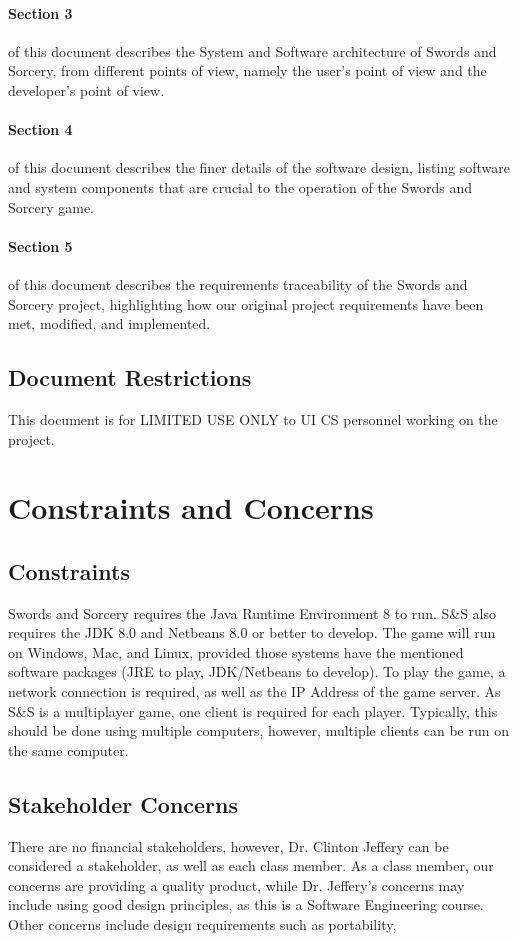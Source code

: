 \documentclass[12pt,a4paper,titlepage]{article}
\begin{document}
\paragraph{Section 3} of this document describes the System and Software architecture of Swords and Sorcery, from different points of view, namely the user's point of view and the developer's point of view.
\paragraph{Section 4} of this document describes the finer details of the software design, listing software and system components that are crucial to the operation of the Swords and Sorcery game. 
\paragraph{Section 5} of this document describes the requirements traceability of the Swords and Sorcery project, highlighting how our original project requirements have been met, modified, and implemented.
\subsection{Document Restrictions}
This document is for LIMITED USE ONLY to UI CS personnel working on the project.
\section{Constraints and Concerns}

\subsection{Constraints}
Swords and Sorcery requires the Java Runtime Environment 8 to run. S\&S also requires the JDK 8.0 and Netbeans 8.0 or better to develop. The game will run on Windows, Mac, and Linux, provided those systems have the mentioned software packages (JRE to play, JDK/Netbeans to develop). To play the game, a network connection is required, as well as the IP Address of the game server. As S\&S is a multiplayer game, one client is required for each player. Typically, this should be done using multiple computers, however, multiple clients can be run on the same computer.

\subsection{Stakeholder Concerns}
There are no financial stakeholders, however, Dr. Clinton Jeffery can be considered a stakeholder, as well as each class member. As a class member, our concerns are providing a quality product, while Dr. Jeffery's concerns may include using good design principles, as this is a Software Engineering course. 
Other concerns include design requirements such as portability, 
\end{document}

